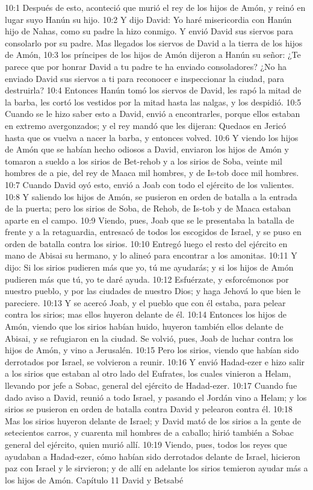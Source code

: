 10:1 Después de esto, aconteció que murió el rey de los hijos de Amón, y reinó en lugar suyo Hanún su hijo.  
10:2 Y dijo David: Yo haré misericordia con Hanún hijo de Nahas, como su padre la hizo conmigo. Y envió David sus siervos para consolarlo por su padre. Mas llegados los siervos de David a la tierra de los hijos de Amón,  
10:3 los príncipes de los hijos de Amón dijeron a Hanún su señor: ¿Te parece que por honrar David a tu padre te ha enviado consoladores? ¿No ha enviado David sus siervos a ti para reconocer e inspeccionar la ciudad, para destruirla?  
10:4 Entonces Hanún tomó los siervos de David, les rapó la mitad de la barba, les cortó los vestidos por la mitad hasta las nalgas, y los despidió.  
10:5 Cuando se le hizo saber esto a David, envió a encontrarles, porque ellos estaban en extremo avergonzados; y el rey mandó que les dijeran: Quedaos en Jericó hasta que os vuelva a nacer la barba, y entonces volved.  
10:6 Y viendo los hijos de Amón que se habían hecho odiosos a David, enviaron los hijos de Amón y tomaron a sueldo a los sirios de Bet-rehob y a los sirios de Soba, veinte mil hombres de a pie, del rey de Maaca mil hombres, y de Is-tob doce mil hombres.  
10:7 Cuando David oyó esto, envió a Joab con todo el ejército de los valientes.  
10:8 Y saliendo los hijos de Amón, se pusieron en orden de batalla a la entrada de la puerta; pero los sirios de Soba, de Rehob, de Is-tob y de Maaca estaban aparte en el campo.  
10:9 Viendo, pues, Joab que se le presentaba la batalla de frente y a la retaguardia, entresacó de todos los escogidos de Israel, y se puso en orden de batalla contra los sirios.  
10:10 Entregó luego el resto del ejército en mano de Abisai su hermano, y lo alineó para encontrar a los amonitas.  
10:11 Y dijo: Si los sirios pudieren más que yo, tú me ayudarás; y si los hijos de Amón pudieren más que tú, yo te daré ayuda.  
10:12 Esfuérzate, y esforcémonos por nuestro pueblo, y por las ciudades de nuestro Dios; y haga Jehová lo que bien le pareciere.  
10:13 Y se acercó Joab, y el pueblo que con él estaba, para pelear contra los sirios; mas ellos huyeron delante de él.  
10:14 Entonces los hijos de Amón, viendo que los sirios habían huido, huyeron también ellos delante de Abisai, y se refugiaron en la ciudad. Se volvió, pues, Joab de luchar contra los hijos de Amón, y vino a Jerusalén.  
10:15 Pero los sirios, viendo que habían sido derrotados por Israel, se volvieron a reunir.  
10:16 Y envió Hadad-ezer e hizo salir a los sirios que estaban al otro lado del Eufrates, los cuales vinieron a Helam, llevando por jefe a Sobac, general del ejército de Hadad-ezer.  
10:17 Cuando fue dado aviso a David, reunió a todo Israel, y pasando el Jordán vino a Helam; y los sirios se pusieron en orden de batalla contra David y pelearon contra él.  
10:18 Mas los sirios huyeron delante de Israel; y David mató de los sirios a la gente de setecientos carros, y cuarenta mil hombres de a caballo; hirió también a Sobac general del ejército, quien murió allí.  
10:19 Viendo, pues, todos los reyes que ayudaban a Hadad-ezer, cómo habían sido derrotados delante de Israel, hicieron paz con Israel y le sirvieron; y de allí en adelante los sirios temieron ayudar más a los hijos de Amón.  
Capítulo 11
David y Betsabé  

